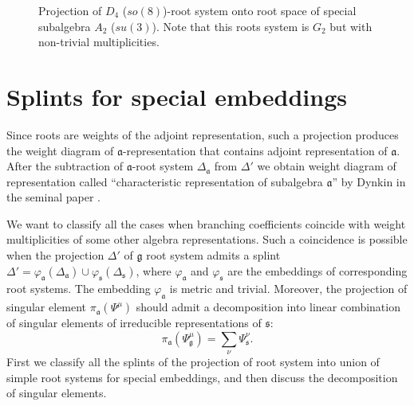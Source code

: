 \documentclass{article}
\newcommand{\pia}{\pi_{\mathfrak{a}}}
\newcommand{\gf}{\mathfrak{g}}
\newcommand{\af}{\mathfrak{a}}
\newcommand{\sfr}{\mathfrak{s}}
\begin{document}
\begin{figure}[h!bt]
  \noindent{}
  \caption{Projection of $D_{4}$ ($so(8)$)-root system onto root space of special subalgebra $A_{2}$
    ($su(3)$). Note that this roots system is $G_{2}$ but with non-trivial multiplicities. }
 \label{fig:d4-a2_splint}
\end{figure}



\section{Splints for special embeddings}
\label{sec:splints-spec-embedd}

Since roots are weights of the adjoint representation, such a projection produces the weight diagram
of $\af$-representation that contains adjoint representation of $\af$. After the subtraction of
$\af$-root system $\Delta_{\af}$ from $\Delta'$ we obtain weight diagram of representation called
``characteristic representation of subalgebra $\af$'' by Dynkin in the seminal paper
\cite{dynkin1952semisimple}.

We want to classify all the cases when branching coefficients coincide with weight multiplicities of
some other algebra representations. Such a coincidence is possible when the projection $\Delta'$ of
$\gf$ root system admits a splint $\Delta'=\varphi_{\af}(\Delta_{\af})\cup
\varphi_{\sfr}(\Delta_{\sfr})$, where $\varphi_{\af}$ and $\varphi_{\sfr}$ are the embeddings of
corresponding root systems. The embedding $\varphi_{\af}$ is metric and trivial. Moreover, the
projection of singular element $\pia\left(\Psi^{\mu}\right)$ should admit a decomposition into
linear combination of singular elements of irreducible representations of $\sfr$:
\begin{equation}
  \label{eq:4}
  \pia\left(\Psi^{\mu}_{\gf}\right)=\sum_{\nu} \Psi^{\nu}_{\sfr}.
\end{equation}
First we classify all the splints
of the projection of root system into union of simple root systems for special embeddings, and then
discuss the decomposition of singular elements.
\end{document}
